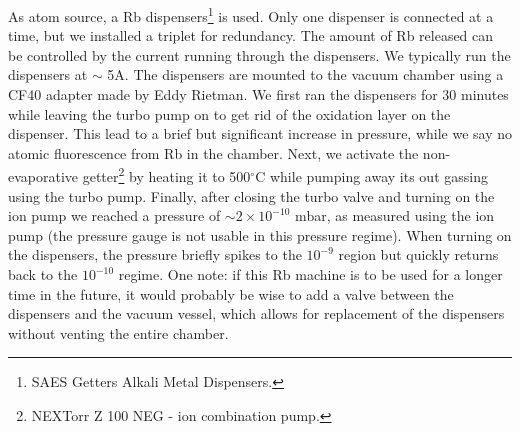 As atom source, a Rb dispensers\footnote{SAES Getters Alkali Metal Dispensers.} is used.
Only one dispenser is connected at a time, but we installed a triplet for redundancy.
The amount of Rb released can be controlled by the current running through the dispensers.
We typically run the dispensers at $\sim$ 5A.
The dispensers are mounted to the vacuum chamber using a CF40 adapter made by Eddy Rietman.
We first ran the dispensers for 30 minutes while leaving the turbo pump on to get rid of the oxidation layer on the dispenser.
This lead to a brief but significant increase in pressure, while we say no atomic fluorescence from Rb in the chamber.  
Next, we activate the non-evaporative getter\footnote{NEXTorr Z 100 NEG - ion combination pump.} by heating it to 500${}^{\circ}$C while pumping away its out gassing using the turbo pump. 
Finally, after closing the turbo valve and turning on the ion pump we reached a pressure of $\sim 2\times 10^{-10}$ mbar, as measured using the ion pump (the pressure gauge is not usable in this pressure regime).
When turning on the dispensers, the pressure briefly spikes to the $10^{-9}$ region but quickly returns back to the $10^{-10}$ regime.
One note: if this Rb machine is to be used for a longer time in the future, it would probably be wise to add a valve between the dispensers and the vacuum vessel, which allows for replacement of the dispensers without venting the entire chamber. 


